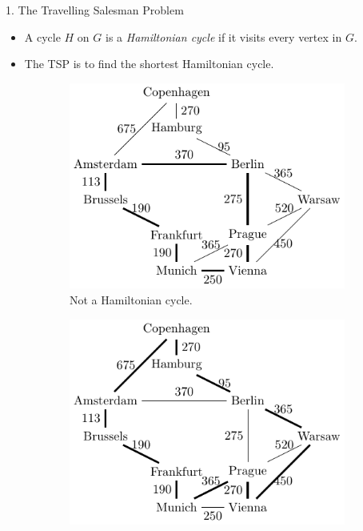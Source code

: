 \documentclass[]{templates/poster}
\begin{document}
\begin{frame}{}
\begin{columns}[t]
\begin{column}{0.422\linewidth}
\begin{block}{\Large 1. The Travelling Salesman Problem}
\begin{itemize}
  \item A cycle $H$ on $G$ is a {\em Hamiltonian cycle} if it visits every vertex in $G$.
  
  \item The TSP is to find the shortest Hamiltonian cycle.
  \end{itemize}
  
  \begin{center}
  \begin{figure}
  \begin{subfigure}[t]{0.32\linewidth}
  \includegraphics[width=\linewidth]{not_hamiltonian}
  \caption{ Not a Hamiltonian cycle.}
  \end{subfigure}
  \begin{subfigure}[t]{0.32\linewidth}
  \includegraphics[width=\linewidth]{not_shortest}

\end{subfigure}
\end{figure}
\end{center}
\end{block}
\end{column}
\end{columns}
\end{frame}
\end{document}
